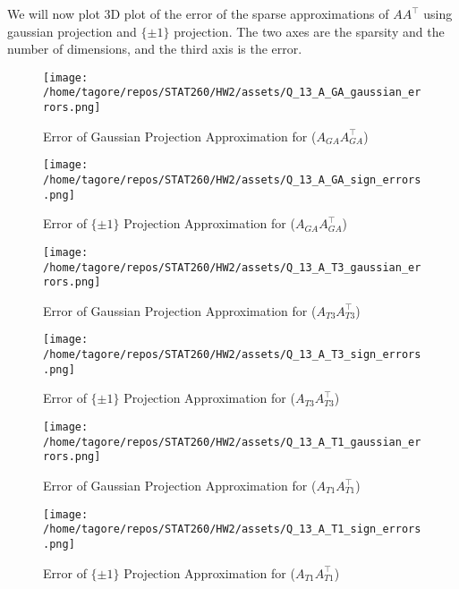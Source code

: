 \documentclass{article}
\begin{document}
We will now plot 3D plot of the error of the sparse approximations of \(A A^\top\) using gaussian projection and $\{\pm 1\}$ projection. The two axes are the sparsity and the number of dimensions, and the third axis is the error.

\begin{figure}[H]
    \centering
    \texttt{[image: /home/tagore/repos/STAT260/HW2/assets/Q\_13\_A\_GA\_gaussian\_errors.png]}
    \caption{Error of Gaussian Projection Approximation for (\(A_{GA} A_{GA}^\top\))}
    \label{fig:GA_gaussian_projection_error_3d}
\end{figure}

\begin{figure}[H]
    \centering
    \texttt{[image: /home/tagore/repos/STAT260/HW2/assets/Q\_13\_A\_GA\_sign\_errors.png]}
    \caption{Error of $\{\pm 1\}$ Projection Approximation for (\(A_{GA} A_{GA}^\top\))}
    \label{fig:GA_pm1_projection_error_3d}
\end{figure}

\begin{figure}[H]
    \centering
    \texttt{[image: /home/tagore/repos/STAT260/HW2/assets/Q\_13\_A\_T3\_gaussian\_errors.png]}
    \caption{Error of Gaussian Projection Approximation for (\(A_{T3} A_{T3}^\top\))}
    \label{fig:T3_gaussian_projection_error_3d}
\end{figure}

\begin{figure}[H]
    \centering
    \texttt{[image: /home/tagore/repos/STAT260/HW2/assets/Q\_13\_A\_T3\_sign\_errors.png]}
    \caption{Error of $\{\pm 1\}$ Projection Approximation for (\(A_{T3} A_{T3}^\top\))}
    \label{fig:T3_pm1_projection_error_3d}
\end{figure}

\begin{figure}[H]
    \centering
    \texttt{[image: /home/tagore/repos/STAT260/HW2/assets/Q\_13\_A\_T1\_gaussian\_errors.png]}
    \caption{Error of Gaussian Projection Approximation for (\(A_{T1} A_{T1}^\top\))}
    \label{fig:T1_gaussian_projection_error_3d}
\end{figure}

\begin{figure}[H]
    \centering
    \texttt{[image: /home/tagore/repos/STAT260/HW2/assets/Q\_13\_A\_T1\_sign\_errors.png]}
    \caption{Error of $\{\pm 1\}$ Projection Approximation for (\(A_{T1} A_{T1}^\top\))}
    \label{fig:T1_pm1_projection_error_3d}
\end{figure}


\end{document}
